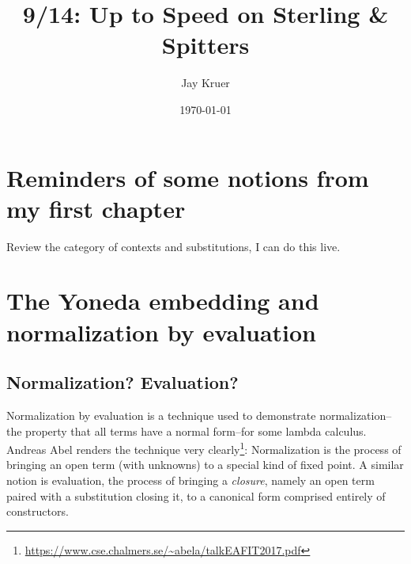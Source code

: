 \documentclass[11pt]{article}
\author{Jay Kruer}
\date{\today}
\title{9/14: Up to Speed on Sterling \& Spitters}
\begin{document}
\maketitle
\tableofcontents

\section{Reminders of some notions from my first chapter}
\label{sec:org36fc68a}
Review the category of contexts and substitutions, I can do this live.
\section{The Yoneda embedding and normalization by evaluation}
\label{sec:org453ef65}
\subsection{Normalization? Evaluation?}
\label{sec:org58d62f4}
Normalization by evaluation is a technique used to demonstrate normalization--
the property that all terms have a normal form--for some lambda calculus.
Andreas Abel renders the technique very clearly\footnote{\url{https://www.cse.chalmers.se/\~abela/talkEAFIT2017.pdf}}: Normalization is the
process of bringing an open term (with unknowns) to a special kind of fixed
point. A similar notion is evaluation, the process of bringing a \emph{closure},
namely an open term paired with a substitution closing it, to a canonical form
comprised entirely of constructors.
\end{document}
